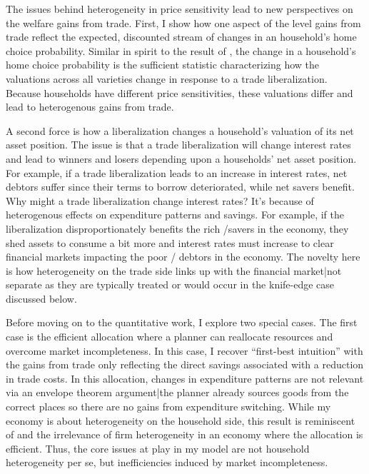 \documentclass[12pt,pdftex]{article}
\begin{document}
\begin{onehalfspacing}
The issues behind heterogeneity in price sensitivity lead to new perspectives on the welfare gains from trade. First, I show how one aspect of the  level gains from trade reflect the expected, discounted stream of changes in an household's home choice probability. Similar in spirit to the result of \citet*{arkolakis2012new}, the change in a household's home choice probability is the sufficient statistic characterizing how the valuations across all varieties change in response to a trade liberalization. Because households have different price sensitivities, these valuations differ and lead to heterogenous gains from trade.

A second force is how a liberalization changes a household's valuation of its net asset position. The issue is that a trade liberalization will change interest rates and lead to winners and losers depending upon a households' net asset position. For example, if a trade liberalization leads to an increase in interest rates, net debtors suffer since their terms to borrow deteriorated, while net savers benefit. Why might a trade liberalization change interest rates? It's because of heterogenous effects on expenditure patterns and savings. For example, if the liberalization disproportionately benefits the rich /savers in the economy, they shed assets to consume a bit more and interest rates must increase to clear financial markets impacting the poor / debtors in the economy. The novelty here is how heterogeneity on the trade side links up with the financial market|not separate as they are typically treated or would occur in the knife-edge case discussed below.

Before moving on to the quantitative work, I explore two special cases. The first case is the efficient allocation where a planner can reallocate resources and overcome market incompleteness. In this case, I recover ``first-best intuition'' with the gains from trade only reflecting the direct savings associated with a reduction in trade costs. In this allocation, changes in expenditure patterns are not relevant via an envelope theorem argument|the planner already sources goods from the correct places so there are no gains from expenditure switching. While my economy is about heterogeneity on the household side, this result is reminiscent of \citet{AtkesonBurstein2010} and the irrelevance of firm heterogeneity in an economy where the allocation is efficient. Thus, the core issues at play in my model are not household heterogeneity per se, but inefficiencies induced by market incompleteness.


\end{onehalfspacing}
\end{document}
